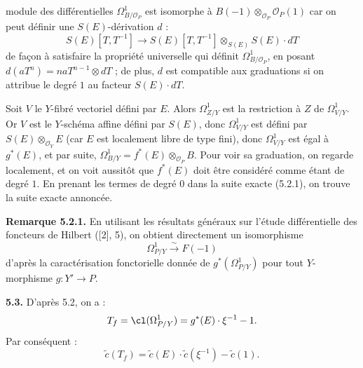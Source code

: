 module des différentielles \(\Omega^1_{B/\mathcal O_P}\) est isomorphe à \(B(-1)\otimes_{\mathcal O_P}\mathcal O_P(1)\) car on peut définir une \(S(E)\)-dérivation \(d\) :
\[
S(E)[T,T^{-1}]
\longrightarrow
S(E)[T,T^{-1}]\otimes_{S(E)}S(E)\cdot dT
\]
de façon à satisfaire la propriété universelle qui définit \(\Omega^1_{B/\mathcal O_P}\), en posant \(d(aT^n)=naT^{n-1}\otimes dT\) ; de plus, \(d\) est compatible aux graduations si on attribue le degré \(1\) au facteur \(S(E)\cdot dT\).

Soit \(V\) le \(Y\)-fibré vectoriel défini par \(E\). Alors \(\Omega^1_{Z/Y}\) est la restriction à \(Z\) de \(\Omega^1_{V/Y}\). Or \(V\) est le \(Y\)-schéma affine défini par \(S(E)\), donc \(\Omega^1_{V/Y}\) est défini par \(S(E)\otimes_{\mathcal O_Y}E\) (car \(E\) est localement libre de type fini), donc \(\Omega^1_{V/Y}\) est égal à \(g^*(E)\), et par suite, \(\Omega^1_{B/Y}=f^*(E)\otimes_{\mathcal O_P}B\). Pour voir sa graduation, on regarde localement, et on voit aussitôt que \(f^*(E)\) doit être considéré comme étant de degré \(1\). En prenant les termes de degré \(0\) dans la suite exacte (5.2.1), on trouve la suite exacte annoncée.

\textbf{Remarque 5.2.1.} En utilisant les résultats généraux sur l'étude différentielle des foncteurs de Hilbert ([2], 5), on obtient directement un isomorphisme
\[
\Omega^1_{P/Y}\xrightarrow{\sim}F(-1)
\]
d'après la caractérisation fonctorielle donnée de \(g^*(\Omega^1_{P/Y})\) pour tout \(Y\)-morphisme \(g:Y'\to P\).

\textbf{5.3.} D'après 5.2, on a :
\[
 T_f=\cl(\Omega^1_{P/Y})=g^*(E)\cdot\xi^{-1}-1.
\]
Par conséquent :
\[
 \widetilde c(T_f)=\widetilde c(E)\cdot\widetilde c(\xi^{-1})-\widetilde c(1).
\]
